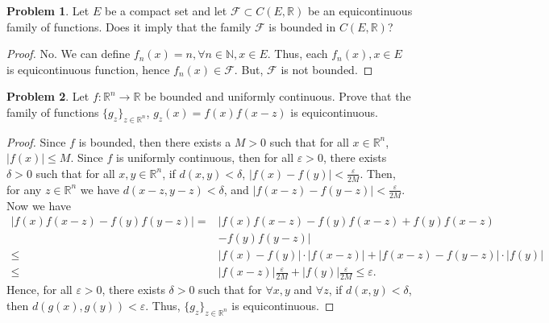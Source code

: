 \documentclass[11pt]{article}
\theoremstyle{definition}
\newtheorem{problem}{Problem}
\theoremstyle{definition}
\begin{document}
\medskip

\begin{problem}
Let $E$ be a compact set and
let $\mathcal{F}\subset C(E,\mathbb{R})$ be an equicontinuous family
of functions. Does it imply that the family $\mathcal{F}$
is bounded in $C(E,\mathbb{R})$?
\end{problem}
\begin{proof}
No. We can define $f_n(x) = n, \forall n\in \mathbb{N}, x\in E$. Thus, each $f_n(x), x\in E$ is equicontinuous function, hence $f_n(x) \in \mathcal{F}$. But, $\mathcal{F}$ is not bounded.
\end{proof}

\medskip


\begin{problem}
Let $f:\mathbb{R}^n\to\mathbb{R}$ be bounded and uniformly continuous.
Prove that the family of functions $\{ g_z\}_{z\in\mathbb{R}^n}$,
$g_z(x)=f(x)f(x-z)$ is equicontinuous.
\end{problem}
\begin{proof}
Since $f$ is bounded, then there exists a $M > 0$ such that for all $x\in\mathbb{R}^n$, $|f(x)| \leq M$. Since $f$ is uniformly continuous, then for all $\varepsilon > 0$, there exists $\delta > 0$ such that for all $x,y\in \mathbb{R}^n$, if $d(x,y) < \delta$, $|f(x) - f(y)| < \frac{\varepsilon}{2M}$. Then, for any $z\in \mathbb{R}^n$ we have $d(x-z, y-z) < \delta$, and $|f(x-z) - f(y-z)| < \frac{\varepsilon}{2M}$. Now we have
\begin{align*}
    |f(x)f(x-z) - f(y)f(y-z)| = & |f(x)f(x-z) - f(y)f(x-z) + f(y)f(x-z) \\
    & - f(y)f(y-z)| \\
    \leq & |f(x) - f(y)| \cdot |f(x-z)| + |f(x-z) - f(y-z)| \cdot |f(y)| \\
    \leq &  |f(x-z)| \frac{\varepsilon}{2M} + |f(y)| \frac{\varepsilon}{2M} \leq \varepsilon.
\end{align*}
Hence, for all $\varepsilon > 0$, there exists $\delta > 0$ such that for $\forall x,y$ and $\forall z$, if $d(x,y) < \delta$, then $d(g(x), g(y)) < \varepsilon$. Thus, $\{ g_z\}_{z\in\mathbb{R}^n}$ is equicontinuous.
\end{proof}

\medskip
\end{document}
